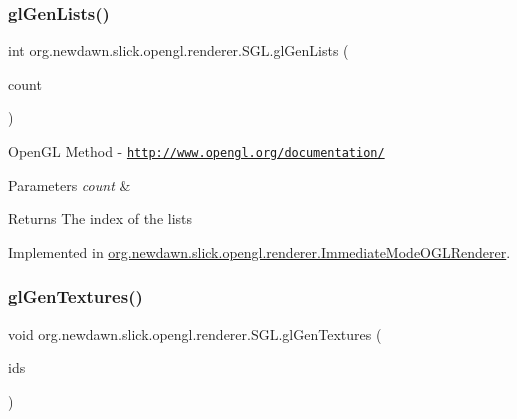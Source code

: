 \mbox{\label{interfaceorg_1_1newdawn_1_1slick_1_1opengl_1_1renderer_1_1_s_g_l_a2c623d00bb2450569a6c86a71024b83d}} 
\subsubsection{\texorpdfstring{gl\+Gen\+Lists()}{glGenLists()}}
{\footnotesize\ttfamily int org.\+newdawn.\+slick.\+opengl.\+renderer.\+S\+G\+L.\+gl\+Gen\+Lists (\begin{DoxyParamCaption}\item[{int}]{count }\end{DoxyParamCaption})}

Open\+GL Method -\/  \href{http://www.opengl.org/documentation/}{\tt http\+://www.\+opengl.\+org/documentation/}


\begin{DoxyParams}{Parameters}
{\em count} & \\
\hline
\end{DoxyParams}
\begin{DoxyReturn}{Returns}
The index of the lists 
\end{DoxyReturn}


Implemented in \mbox{\hyperlink{classorg_1_1newdawn_1_1slick_1_1opengl_1_1renderer_1_1_immediate_mode_o_g_l_renderer_af14eac568c10241542cceb2df678e91d}{org.\+newdawn.\+slick.\+opengl.\+renderer.\+Immediate\+Mode\+O\+G\+L\+Renderer}}.

\mbox{\label{interfaceorg_1_1newdawn_1_1slick_1_1opengl_1_1renderer_1_1_s_g_l_ab3f3f950cf59599784f17a0d19667829}} 
\subsubsection{\texorpdfstring{gl\+Gen\+Textures()}{glGenTextures()}}
{\footnotesize\ttfamily void org.\+newdawn.\+slick.\+opengl.\+renderer.\+S\+G\+L.\+gl\+Gen\+Textures (\begin{DoxyParamCaption}\item[{Int\+Buffer}]{ids }\end{DoxyParamCaption})}

